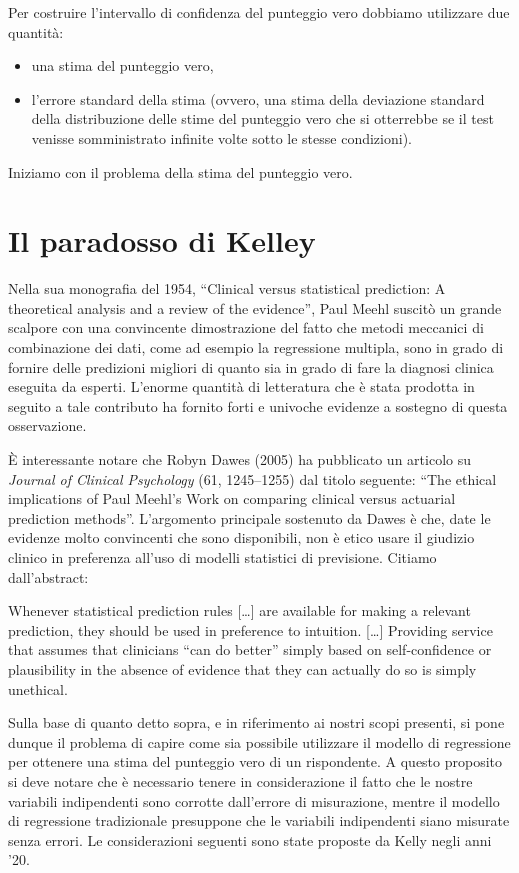 \documentclass[
  11pt,
]{krantz}
\providecommand{\tightlist}{%
  \setlength{\itemsep}{0pt}\setlength{\parskip}{0pt}}
\theoremstyle{definition}
\theoremstyle{definition}
\theoremstyle{definition}
\theoremstyle{definition}
\theoremstyle{remark}
\begin{document}
Per costruire l'intervallo di confidenza del punteggio vero dobbiamo utilizzare due quantità:

\begin{itemize}
\tightlist
\item
  una stima del punteggio vero,
\item
  l'errore standard della stima (ovvero, una stima della deviazione standard della distribuzione delle stime del punteggio vero che si otterrebbe se il test venisse somministrato infinite volte sotto le stesse condizioni).
\end{itemize}

Iniziamo con il problema della stima del punteggio vero.

\hypertarget{il-paradosso-di-kelley}{%
\section{Il paradosso di Kelley}\label{il-paradosso-di-kelley}}

Nella sua monografia del 1954, ``Clinical versus statistical prediction: A theoretical analysis and a review of the evidence'', Paul Meehl suscitò un grande scalpore con una convincente dimostrazione del fatto che metodi meccanici di combinazione dei dati, come ad esempio la regressione multipla, sono in grado di fornire delle predizioni migliori di quanto sia in grado di fare la diagnosi clinica eseguita da esperti. L'enorme quantità di letteratura che è stata prodotta in seguito a tale contributo ha fornito forti e univoche evidenze a sostegno di questa osservazione.

È interessante notare che Robyn Dawes (2005) ha pubblicato un articolo su \emph{Journal of Clinical Psychology} (61, 1245--1255) dal titolo seguente: ``The ethical implications of Paul Meehl's Work on comparing clinical versus actuarial prediction methods''. L'argomento principale sostenuto da Dawes è che, date le evidenze molto convincenti che sono disponibili, non è etico usare il giudizio clinico in preferenza all'uso di modelli statistici di previsione. Citiamo dall'abstract:

Whenever statistical prediction rules {[}\ldots{]} are available for making a relevant prediction, they should be used in preference to intuition. {[}\ldots{]} Providing service that assumes that clinicians ``can do better'' simply based on self-confidence or plausibility in the absence of evidence that they can actually do so is simply unethical.

Sulla base di quanto detto sopra, e in riferimento ai nostri scopi presenti, si pone dunque il problema di capire come sia possibile utilizzare il modello di regressione per ottenere una stima del punteggio vero di un rispondente. A questo proposito si deve notare che è necessario tenere in considerazione il fatto che le nostre variabili indipendenti sono corrotte dall'errore di misurazione, mentre il modello di regressione tradizionale presuppone che le variabili indipendenti siano misurate senza errori. Le considerazioni seguenti sono state proposte da Kelly negli anni '20.
\end{document}
